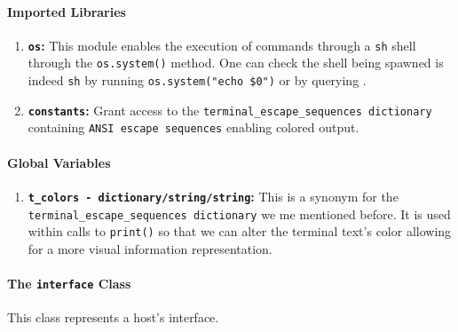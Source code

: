     \paragraph{Imported Libraries}
        \begin{enumerate}
            \item \textbf{\texttt{os}:} This module enables the execution of commands through a \texttt{sh} shell through the \texttt{os.system()} method. One can check the shell being spawned is indeed \texttt{sh} by running \texttt{\allowbreak os.system("echo \$0")} or by querying \cite{bib:man-system}.
            \item \textbf{\texttt{constants}:} Grant access to the \texttt{\allowbreak terminal\_escape\_sequences dictionary} containing \texttt{ANSI escape sequences} enabling colored output.
        \end{enumerate}

    \paragraph{Global Variables}
        \begin{enumerate}
            \item \textbf{\texttt{\allowbreak t\_colors - dictionary/string/string}:} This is a synonym for the \texttt{\allowbreak terminal\_escape\_sequences dictionary} we me mentioned before. It is used within calls to \texttt{print()} so that we can alter the terminal text's color allowing for a more visual information representation.
        \end{enumerate}

    \paragraph{The \texttt{interface} Class}
        This class represents a host's interface.

